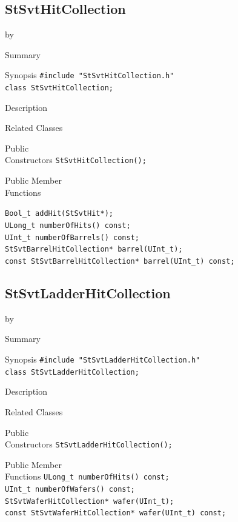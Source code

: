 \documentclass[twoside]{article}
\newcommand{\entrylabel}[1]{\mbox{\textbf{{#1}}}\hfil}%
\newenvironment{entry}
{\begin{list}{}%
    {\renewcommand{\makelabel}{\entrylabel}%
     \setlength{\labelwidth}{90pt}%
     \setlength{\leftmargin}{\labelwidth}
     \advance\leftmargin by \labelsep%
      }%
    }%
  {\end{list}}
\newcommand{\Entrylabel}[1]%
{\raisebox{0pt}[1ex][0pt]{\makebox[\labelwidth][l]%
    {\parbox[t]{\labelwidth}{\hspace{0pt}\textbf{{#1}}}}}}
\newenvironment{Entry}%
{\renewcommand{\entrylabel}{\Entrylabel}\begin{entry}}%
  {\end{entry}}
\begin{document}
\subsection{StSvtHitCollection}
\label{sec:StSvtHitCollection}
\begin{Entry}
\item[Summary]
\item[Synopsis]
    \verb+#include "StSvtHitCollection.h"+\\
    \verb+class StSvtHitCollection;+\\
\item[Description]
\item[Related Classes]
\item[Public\\ Constructors]
    \verb+StSvtHitCollection();+\\
\item[Public Member\\ Functions]

    \verb+Bool_t addHit(StSvtHit*);+\\

    \verb+ULong_t numberOfHits() const;+\\

    \verb+UInt_t numberOfBarrels() const;+\\
    
    \verb+StSvtBarrelHitCollection* barrel(UInt_t);+\\
    \verb+const StSvtBarrelHitCollection* barrel(UInt_t) const;+\\
\end{Entry}
\clearpage


\subsection{StSvtLadderHitCollection}
\label{sec:StSvtLadderHitCollection}
\begin{Entry}
\item[Summary]
\item[Synopsis]
    \verb+#include "StSvtLadderHitCollection.h"+\\
    \verb+class StSvtLadderHitCollection;+\\
\item[Description]
\item[Related Classes]
\item[Public\\ Constructors]
    \verb+StSvtLadderHitCollection();+\\
\item[Public Member\\ Functions]
    \verb+ULong_t numberOfHits() const;+\\
    \verb+UInt_t numberOfWafers() const;+\\
    \verb+StSvtWaferHitCollection* wafer(UInt_t);+\\
    \verb+const StSvtWaferHitCollection* wafer(UInt_t) const;+\\
\end{Entry}
\clearpage
\end{document}
